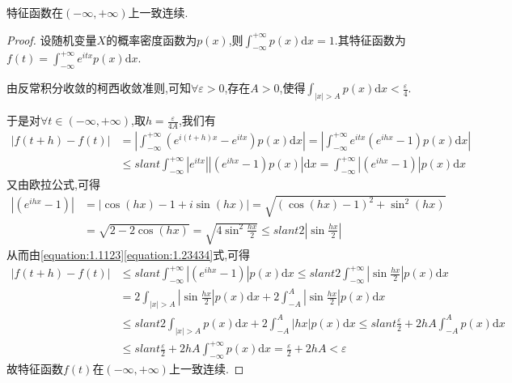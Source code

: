 \documentclass[lang=cn,newtx,10pt,scheme=chinese]{../../Template/elegantbook}
\begin{document}
\begin{theorem}[特征函数性质]\label{theorem:特征函数性质}
    特征函数在$(-\infty,+\infty)$上一致连续.
\end{theorem}
\begin{proof}
设随机变量\(X\)的概率密度函数为\(p(x)\),则\(\int_{-\infty}^{+\infty}p(x)\mathrm{d}x = 1\).其特征函数为\(f(t) = \int_{-\infty}^{+\infty}e^{itx}p(x)\mathrm{d}x\).

由反常积分收敛的柯西收敛准则,可知\(\forall \varepsilon > 0\),存在\(A > 0\),使得\(\int_{|x| > A}p(x)\mathrm{d}x < \frac{\varepsilon}{4}\).

于是对\(\forall t \in (-\infty, +\infty)\),取\(h = \frac{\varepsilon}{4A}\),我们有
\begin{equation}\label{equation:1.1123}
\begin{aligned}
|f(t + h) - f(t)| &= \left|\int_{-\infty}^{+\infty}(e^{i(t + h)x} - e^{itx})p(x)\mathrm{d}x\right|
= \left|\int_{-\infty}^{+\infty}e^{itx}(e^{ihx} - 1)p(x)\mathrm{d}x\right|\\
&\leqslant slant \int_{-\infty}^{+\infty}|e^{itx}||(e^{ihx} - 1)p(x)|\mathrm{d}x
= \int_{-\infty}^{+\infty}|(e^{ihx} - 1)|p(x)\mathrm{d}x
\end{aligned}
\end{equation}
又由欧拉公式,可得
\begin{equation}\label{equation:1.23434}
    \begin{aligned}
|(e^{ihx} - 1)| &= |\cos(hx) - 1 + i\sin(hx)|
= \sqrt{(\cos(hx) - 1)^2 + \sin^2(hx)}\\
&= \sqrt{2 - 2\cos(hx)}
= \sqrt{4\sin^2\frac{hx}{2}} \leqslant slant 2\left|\sin\frac{hx}{2}\right|
\end{aligned}
\end{equation}
从而由\eqref{equation:1.1123}\eqref{equation:1.23434}式,可得
\begin{align*}
|f(t + h) - f(t)| &\leqslant slant \int_{-\infty}^{+\infty}|(e^{ihx} - 1)|p(x)\mathrm{d}x
\leqslant slant 2\int_{-\infty}^{+\infty}\left|\sin\frac{hx}{2}\right|p(x)\mathrm{d}x\\
&= 2\int_{|x| > A}\left|\sin\frac{hx}{2}\right|p(x)\mathrm{d}x + 2\int_{-A}^{A}\left|\sin\frac{hx}{2}\right|p(x)\mathrm{d}x\\
&\leqslant slant 2\int_{|x| > A}p(x)\mathrm{d}x + 2\int_{-A}^{A}|hx|p(x)\mathrm{d}x
\leqslant slant \frac{\varepsilon}{2} + 2hA\int_{-A}^{A}p(x)\mathrm{d}x\\
&\leqslant slant \frac{\varepsilon}{2} + 2hA\int_{-\infty}^{+\infty}p(x)\mathrm{d}x
= \frac{\varepsilon}{2} + 2hA < \varepsilon
\end{align*}
故特征函数\(f(t)\)在\((-\infty, +\infty)\)上一致连续. 
\end{proof}
\end{document}
